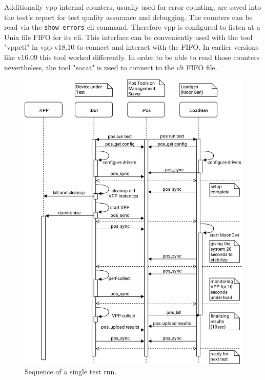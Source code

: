 Additionally \Ac{vpp} internal counters, usually used for error
counting, are saved into the test's report for test quality assurance
and debugging. The counters can be read via the \lstinline|show errors| 
\Ac{cli} command. Therefore \Ac{vpp} is configured to listen
at a Unix file FIFO for its \Ac{cli}. This interface can be
conveniently used with the tool "vppctl" in \Ac{vpp} v18.10 to connect
and interact with the FIFO. In earlier versions like v16.09 this tool
worked differently. In order to be able to read those counters
nevertheless, the tool "socat" is used to connect to the \Ac{cli}
FIFO file.

\newpage

\begin{figure}[!ht]
\noindent\hspace{0.5mm}\includegraphics[width=\linewidth]{pics/procedure-sequence.png}
\caption{Sequence of a single test run. }
\label{testsequence}
\end{figure}

